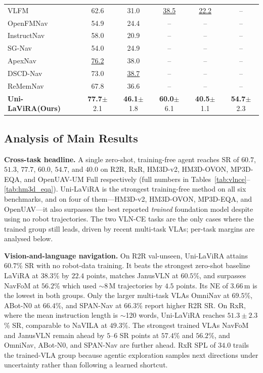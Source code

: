 \documentclass[conference]{IEEEtran}
\newcommand{\ourmethod}{Uni-LaViRA\xspace}
\begin{document}
\begin{table}[t]
{\begin{tabular}{l|cc|cc|c}
VLFM~\cite{yokoyama2024vlfm}             & 62.6 & 31.0 & \underline{38.5} & \underline{22.2} & --   \\
OpenFMNav~\cite{kuang2024openfmnav}      & 54.9 & 24.4 & --   & --   & --   \\
InstructNav~\cite{long2024instructnav}   & 58.0 & 20.9 & --   & --   & --   \\
SG-Nav~\cite{yin2024sgnav}               & 54.0 & 24.9 & --   & --   & --   \\
ApexNav~\cite{kim2025apexnav}            & \underline{76.2} & 38.0 & --   & --   & --   \\
DSCD-Nav~\cite{an2026dscdnav}            & 73.0 & \underline{38.7} & --   & --   & --   \\
ReMemNav~\cite{wu2026rememnav}           & 67.8 & 36.6 & --   & --   & --   \\
\textbf{\ourmethod (Ours)}               &
\textbf{77.7}$\pm$2.1 & \textbf{46.1}$\pm$1.8 &
\textbf{60.0}$\pm$6.1 & \textbf{40.5}$\pm$1.1 &
\textbf{54.7}$\pm$2.3 \\
\bottomrule
\end{tabular}}
\end{table}

\subsection{Analysis of Main Results}
\label{subsec:main_results}
\label{subsec:main_results_analysis}

\textbf{Cross-task headline.} A single zero-shot,
training-free agent reaches SR of $60.7$, $51.3$, $77.7$, $60.0$, $54.7$,
and $40.0$ on R2R, RxR, HM3D-v2, HM3D-OVON, MP3D-EQA, and OpenUAV-UM Full
respectively (full numbers in Tables~\ref{tab:vlnce}--\ref{tab:hm3d_eqa}).
\ourmethod is the strongest training-free method on all six benchmarks,
and on four of them---HM3D-v2, HM3D-OVON, MP3D-EQA, and OpenUAV---it also
surpasses the best reported \emph{trained} foundation model despite using
no robot trajectories. The two VLN-CE tasks are the only cases where the
trained group still leads, driven by recent multi-task VLAs; per-task
margins are analysed below.

\textbf{Vision-and-language navigation.} On R2R val-unseen, \ourmethod attains
$60.7$\% SR with no robot-data training. It beats the strongest zero-shot
baseline LaViRA at $38.3$\% by $22.4$ points, matches JanusVLN at $60.5$\%,
and surpasses NavFoM at $56.2$\% which used $\sim$8\,M trajectories by $4.5$
points. Its NE of $3.66$\,m is the lowest in both groups. Only the larger
multi-task VLAs OmniNav at $69.5$\%, ABot-N0 at $66.4$\%, and SPAN-Nav at
$66.3$\% report higher R2R SR. On RxR, where the mean instruction length is
$\sim$120 words, \ourmethod reaches $51.3\pm 2.3$\% SR, comparable to NaVILA
at $49.3$\%. The strongest trained VLAs NavFoM and JanusVLN remain ahead by
$5$--$6$ SR points at $57.4$\% and $56.2$\%, and OmniNav, ABot-N0, and
SPAN-Nav are further ahead. RxR SPL of
$34.0$ trails the trained-VLA group because agentic exploration samples next
directions under uncertainty rather than following a learned shortcut.
\end{document}
